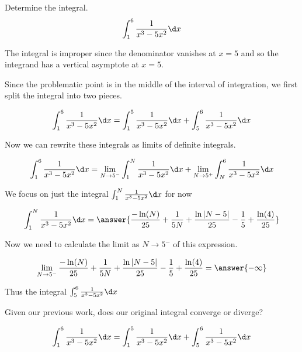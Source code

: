 \documentclass{ximera}
\author{Jason Miller}
\begin{document}
\begin{exercise}
Determine the integral.
\[
\int_{1}^{6} \frac{1}{x^{3}-5x^{2}} \d x
\]

The integral is improper since the denominator vanishes at $x=5$ and so the integrand has a vertical asymptote at $x=5$. 

Since the problematic point is in the middle of the interval of integration, we first split the integral into two pieces. 

\[
\int _{1}^{6} \frac{1}{x^{3}-5x^{2}} \d x=\int_{1}^{5} \frac{1}{x^{3}-5x^{2}} \d x + \int_{5}^{6} \frac{1}{x^{3}-5x^{2}} \d x
\]

Now we can rewrite these integrals as limits of definite integrals. 

\[
\int_{1}^{6} \frac{1}{x^{3}-5x^{2}} \d x= \lim_{N \to 5^{-}} \int_{1}^{N} \frac{1}{x^{3}-5x^{2}} \d x + \lim_{N \to 5^{+}} \int _{N}^{6} 
\frac{1}{x^{3}-5x^{2}} \d x
\]


We focus on just the integral $\int_{1}^{N} \frac{1}{x^{3}-5x^{2}} \d x$ for now

\[
\int_{1}^{N} \frac{1}{x^{3}-5x^{2}} \d x=\answer{  \frac{-\ln(N)}{25} +\frac{1}{5N} + \frac{\ln|N-5|}{25}-\frac{1}{5}+\frac{\ln(4)}{25}  }
\]


\begin{exercise}
Now we need to calculate the limit as $N \to 5^{-}$ of this expression. 

\[
\lim_{N \to 5^{-}}  \frac{-\ln(N)}{25} +\frac{1}{5N} + \frac{\ln|N-5|}{25}-\frac{1}{5}+\frac{\ln(4)}{25} =\answer{ -\infty}
\]

\begin{exercise}
Thus the integral $\int_{5}^{6} \frac{1}{x^{3}-5x^{2}} \d x$

\begin{multipleChoice}
\end{multipleChoice}

\begin{exercise}

Given our previous work, does our original integral converge or diverge?


\[
\int _{1}^{6} \frac{1}{x^{3}-5x^{2}} \d x=\int_{1}^{5} \frac{1}{x^{3}-5x^{2}} \d x + \int_{5}^{6} \frac{1}{x^{3}-5x^{2}} \d x
\]

\begin{multipleChoice}
\end{multipleChoice}


\end{exercise}


\end{exercise}
\end{exercise}
\end{exercise}
\end{document}
